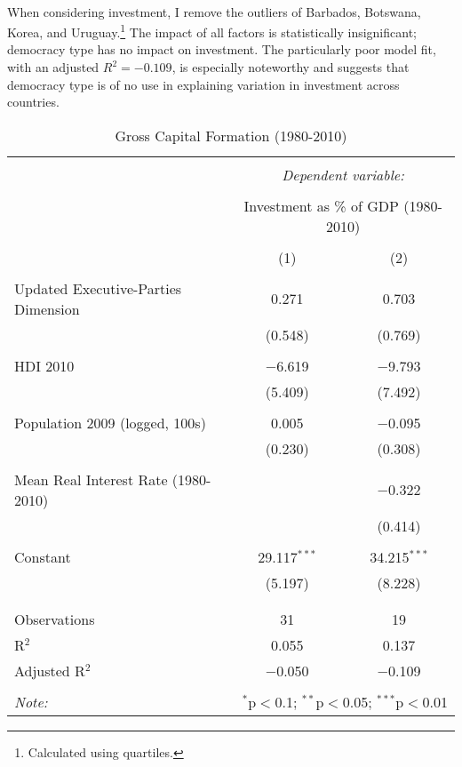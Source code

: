 \documentclass[11pt, oneside]{article}   	%
\let\oldparagraph\paragraph
\renewcommand{\paragraph}[1]{\oldparagraph{#1}\mbox{}}
\begin{document}
\paragraph{}
When considering investment, I remove the outliers of Barbados, Botswana, Korea, and Uruguay.\footnote{  Calculated using quartiles.}  The impact of all factors is statistically insignificant; democracy type has no impact on investment. The particularly poor model fit, with an adjusted \begin{math} R^2 = -0.109 \end{math}, is especially noteworthy and suggests that democracy type is of no use in explaining variation in investment across countries. 

\begin{table}[!htbp] \centering 
  \caption{Gross Capital Formation (1980-2010)} 
  \label{} 
\small 
\begin{tabular}{@{\extracolsep{-15pt}}lcc} 
\\[-1.8ex]\hline 
\hline \\[-1.8ex] 
 & \multicolumn{2}{c}{\textit{Dependent variable:}} \\ 
\cline{2-3} 
\\[-1.8ex] & \multicolumn{2}{c}{Investment as \% of GDP (1980-2010)} \\ 
\\[-1.8ex] & (1) & (2)\\ 
\hline \\[-1.8ex] 
 Updated Executive-Parties Dimension & 0.271 & 0.703 \\ 
  & (0.548) & (0.769) \\ 
  & & \\ 
 HDI 2010 & $-$6.619 & $-$9.793 \\ 
  & (5.409) & (7.492) \\ 
  & & \\ 
 Population 2009 (logged, 100s) & 0.005 & $-$0.095 \\ 
  & (0.230) & (0.308) \\ 
  & & \\ 
 Mean Real Interest Rate (1980-2010) &  & $-$0.322 \\ 
  &  & (0.414) \\ 
  & & \\ 
 Constant & 29.117$^{***}$ & 34.215$^{***}$ \\ 
  & (5.197) & (8.228) \\ 
  & & \\ 
\hline \\[-1.8ex] 
Observations & 31 & 19 \\ 
R$^{2}$ & 0.055 & 0.137 \\ 
Adjusted R$^{2}$ & $-$0.050 & $-$0.109 \\ 
\hline 
\hline \\[-1.8ex] 
\textit{Note:}  & \multicolumn{2}{r}{$^{*}$p$<$0.1; $^{**}$p$<$0.05; $^{***}$p$<$0.01} \\ 
\end{tabular} 
\end{table} 
\end{document}
